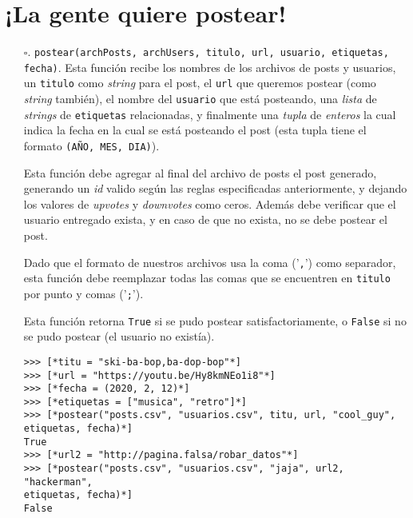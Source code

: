 \section{¡La gente quiere postear!}



\begin{enumerate}
    \item[$\square$.] \texttt{postear(archPosts, archUsers, titulo, url, usuario, etiquetas, fecha)}. Esta función recibe los nombres de los archivos de posts y usuarios, un \texttt{titulo} como \textit{string} para el post, el \texttt{url} que queremos postear (como \textit{string} también), el nombre del \texttt{usuario} que está posteando, una \textit{lista} de \textit{strings} de \texttt{etiquetas} relacionadas, y finalmente una \textit{tupla} de \textit{enteros} la cual indica la fecha en la cual se está posteando el post (esta tupla tiene el formato \texttt{(AÑO, MES, DIA)}).

    Esta función debe agregar al final del archivo de posts el post generado, generando un \textit{id} valido según las reglas especificadas anteriormente, y dejando los valores de \textit{upvotes} y \textit{downvotes} como ceros. Además debe verificar que el usuario entregado exista, y en caso de que no exista, no se debe postear el post.

    Dado que el formato de nuestros archivos usa la coma ('\texttt{,}') como separador, esta función debe reemplazar todas las comas que se encuentren en \texttt{titulo} por punto y comas ('\texttt{;}').

    Esta función retorna \texttt{True} si se pudo postear satisfactoriamente, o \texttt{False} si no se pudo postear (el usuario no existía).

    \begin{lstlisting}[style=consola]
>>> [*titu = "ski-ba-bop,ba-dop-bop"*]
>>> [*url = "https://youtu.be/Hy8kmNEo1i8"*]
>>> [*fecha = (2020, 2, 12)*]
>>> [*etiquetas = ["musica", "retro"]*]
>>> [*postear("posts.csv", "usuarios.csv", titu, url, "cool_guy", 
etiquetas, fecha)*]
True
>>> [*url2 = "http://pagina.falsa/robar_datos"*]
>>> [*postear("posts.csv", "usuarios.csv", "jaja", url2, "hackerman", 
etiquetas, fecha)*]
False
    \end{lstlisting}

\end{enumerate}

